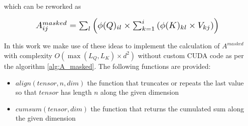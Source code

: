 \noindent{}which can be reworked as

\begin{equation}
	\resizebox{0.8\hsize}{!}{
		$A^{masked}_{ij}= \sum_l \left( \phi(Q)_{il} \times \sum_{k=1}^i \left(\phi(K)_{kl} \times V_{kj} \right) \right)$
	}
\end{equation}

In this work we make use of these ideas to implement the calculation of
 $A^{masked}$ with complexity $O(\max(L_Q, L_K) \times d^2)$ without
 custom CUDA code as per the algorithm \ref{alg:A_masked}. The following functions are provided:
 \begin{itemize}
 	\item $align(tensor, n, dim)$ the function that truncates or repeats the last value so that $tensor$ has length $n$ along the given dimension
 	\item $cumsum(tensor, dim)$ the function that returns the cumulated sum along the given dimension
 \end{itemize}
